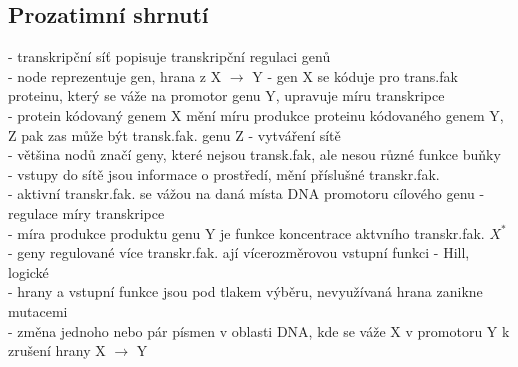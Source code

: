 \documentclass[11pt,a4paper]{report}
\begin{document}
\subsection{Prozatimní shrnutí}
- transkripční síť popisuje transkripční regulaci genů\\
- node reprezentuje gen, hrana z X $\rightarrow$ Y - gen X se kóduje pro trans.fak proteinu, který se váže na promotor genu Y, upravuje míru transkripce\\
\indent - protein kódovaný genem X mění míru produkce proteinu kódovaného genem Y, Z pak zas může být transk.fak. genu Z - vytváření sítě\\
- většina nodů značí geny, které nejsou transk.fak, ale nesou různé funkce buňky\\
- vstupy do sítě jsou informace o prostředí, mění příslušné transkr.fak.\\
- aktivní transkr.fak. se vážou na daná místa DNA promotoru cílového genu - regulace míry transkripce\\
\indent - míra produkce produktu genu Y je funkce koncentrace aktvního transkr.fak. $X^*$\\
\indent - geny regulované více transkr.fak. ají vícerozměrovou vstupní funkci - Hill, logické\\
- hrany a vstupní funkce jsou pod tlakem výběru, nevyužívaná hrana zanikne mutacemi\\
\indent - změna jednoho nebo pár písmen v oblasti DNA, kde se váže X v promotoru Y k zrušení hrany X $\rightarrow$ Y
\end{document}
